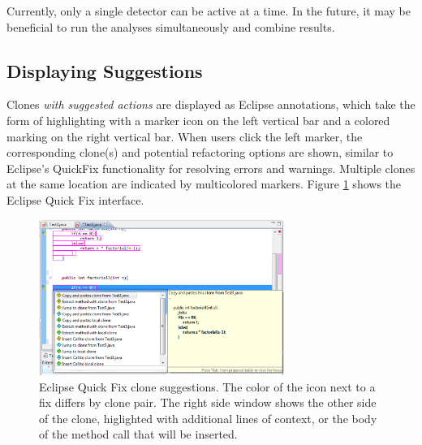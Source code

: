\documentclass[nocopyrightspace,10pt]{sigplanconf}
\begin{document}


Currently, only a single detector can be active at a time. In the
future, it may be beneficial to run the analyses simultaneously and
combine results.

\subsection{Displaying Suggestions}
\label{sec:display}
Clones \emph{with suggested actions} are displayed as Eclipse annotations,
which take 
the form of highlighting with a marker icon on the left vertical bar and a 
colored marking on the right vertical bar.  When users click the left marker,
the corresponding clone(s) and potential refactoring options are shown,
similar to Eclipse's QuickFix functionality for resolving errors and warnings.
Multiple clones at the same location are indicated by multicolored markers.
Figure \ref{fig:screenshot} shows the Eclipse Quick Fix interface.

\begin{figure}[here]
\centering
\includegraphics[width=80mm]{img/screen1.eps}
\caption{Eclipse Quick Fix clone suggestions. The color of the icon
  next to a fix differs by clone pair. The right side window shows the
  other side of the clone, higlighted with additional lines of
  context, or the body of the method call that will be inserted.}
\label{fig:screenshot}
\end{figure}
\end{document}
